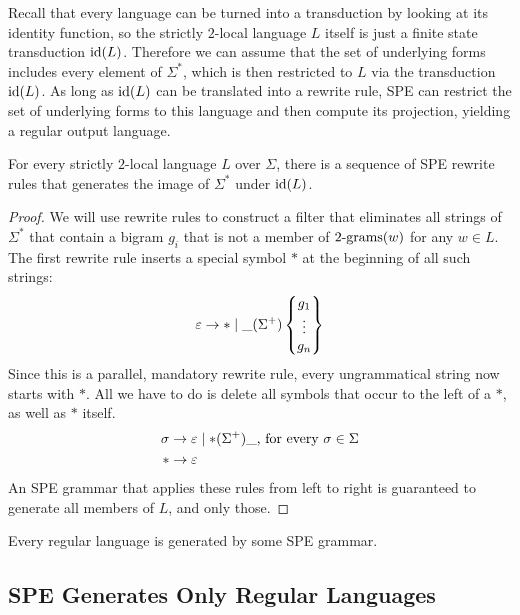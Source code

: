 Recall that every language can be turned into a transduction by looking at its identity function, so the strictly $2$-local language $L$ itself is just a finite state transduction $\mathrm{id}(L)$. 
Therefore we can assume that the set of underlying forms includes every element of $\Sigma^*$, which is then restricted to $L$ via the transduction $\mathrm{id}(L)$.
As long as $\mathrm{id}(L)$ can be translated into a rewrite rule, SPE can restrict the set of underlying forms to this language and then compute its projection, yielding a regular output language. 
%
\begin{lemma}
    For every strictly $2$-local language $L$ over $\Sigma$, there is a sequence of SPE rewrite rules that generates the image of $\Sigma^*$ under $\mathrm{id}(L)$.
\end{lemma}
%
\begin{proof}
    We will use rewrite rules to construct a filter that eliminates all strings of $\Sigma^*$ that contain a bigram $g_i$ that is not a member of $2\mathrm{\text{-}grams}(w)$ for any $w \in L$.
    The first rewrite rule inserts a special symbol $*$ at the beginning of all such strings:
    \[
        \varepsilon \rightarrow * \mid \_ (\Sigma^+)
            \left \{
                \begin{matrix}
                    g_1\\
                    \vdots\\
                    g_n
                \end{matrix}
            \right \}
    \]
    Since this is a parallel, mandatory rewrite rule, every ungrammatical string now starts with $*$.
    All we have to do is delete all symbols that occur to the left of a $*$, as well as $*$ itself.
    \begin{align*}
        \sigma & \rightarrow \varepsilon \mid * (\Sigma^+) \_ \text{, for every } \sigma \in \Sigma\\
        *      & \rightarrow \varepsilon
    \end{align*}
    An SPE grammar that applies these rules from left to right is guaranteed to generate all members of $L$, and only those.
\end{proof}
%
\begin{corollary}
    Every regular language is generated by some SPE grammar.
\end{corollary}


\subsection{SPE Generates Only Regular Languages}

